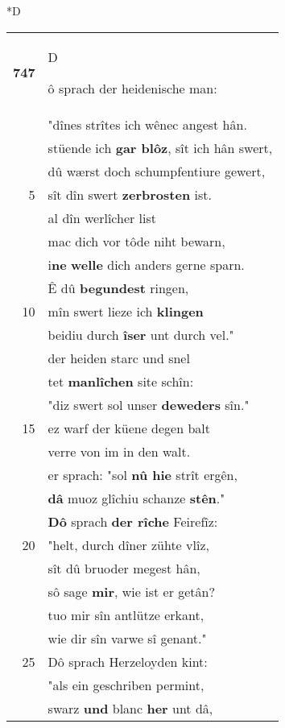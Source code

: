 \documentclass[8pt,a4paper,notitlepage]{article}
\begin{document}
\begin{table}[ht]
\begin{minipage}[t]{0.5\linewidth}
\small
\begin{center}*D
\end{center}
\begin{tabular}{rl}
\textbf{747} & \begin{large}D\end{large}ô sprach der heidenische man:\\ 
 & "dînes strîtes ich wênec angest hân.\\ 
 & stüende ich \textbf{gar blôz}, sît ich hân swert,\\ 
 & dû wærst doch schumpfentiure gewert,\\ 
5 & sît dîn swert \textbf{zerbrosten} ist.\\ 
 & al dîn werlîcher list\\ 
 & mac dich vor tôde niht bewarn,\\ 
 & i\textbf{ne} \textbf{welle} dich anders gerne sparn.\\ 
 & Ê dû \textbf{begundest} ringen,\\ 
10 & mîn swert lieze ich \textbf{klingen}\\ 
 & beidiu durch \textbf{îser} unt durch vel."\\ 
 & der heiden starc und snel\\ 
 & tet \textbf{manlîchen} site schîn:\\ 
 & "diz swert sol unser \textbf{deweders} sîn."\\ 
15 & ez warf der küene degen balt\\ 
 & verre von im in den walt.\\ 
 & er sprach: "sol \textbf{nû hie} strît ergên,\\ 
 & \textbf{dâ} muoz glîchiu schanze \textbf{stên}."\\ 
 & \textbf{Dô} sprach \textbf{der rîche} Feirefîz:\\ 
20 & "helt, durch dîner zühte vlîz,\\ 
 & sît dû bruoder megest hân,\\ 
 & sô sage \textbf{mir}, wie ist er getân?\\ 
 & tuo mir sîn antlütze erkant,\\ 
 & wie dir sîn varwe sî genant."\\ 
25 & Dô sprach Herzeloyden kint:\\ 
 & "als ein geschriben permint,\\ 
 & swarz \textbf{und} blanc \textbf{her} unt dâ,\\ 

\end{tabular}
\end{minipage}
\end{table}
\end{document}
